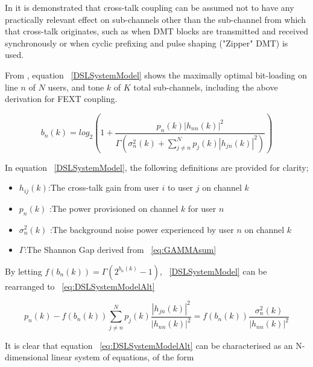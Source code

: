 In \cite{AM09} it is demonstrated that cross-talk coupling can be assumed not to have any practically relevant effect on sub-channels other than the sub-channel from which that cross-talk originates, such as when DMT blocks are transmitted and received synchronously or when cyclic prefixing and pulse shaping ("Zipper" DMT\cite{FSJ99}) is used.

From \cite{CA06}, equation ~\eqref{DSLSystemModel} shows the maximally optimal bit-loading on line \(n\) of \(N\) users, and tone \(k\) of \(K\) total sub-channels, including the above derivation for FEXT coupling.

\begin{equation}\label{DSLSystemModel}
b_n(k)=log_2\left(1+\frac{p_n(k) |h_{nn}(k)|^2}{\Gamma \left( \sigma_n^2(k)+\sum_{j\neq n}^N p_j(k)|h_{jn}(k)|^2 \right)} \right)
\end{equation}

In equation ~\eqref{DSLSystemModel}, the following definitions are provided for clarity;

\begin{itemize}
  \item \(h_{ij}(k)\):The cross-talk gain from user \(i\) to user \(j\) on channel \(k\)
  \item \(p_n(k)\) :The power provisioned on channel \(k\) for user \(n\)
  \item \(\sigma^2_n(k)\) :The background noise power experienced by user \(n\) on channel \(k\)
  \item \(\Gamma\):The Shannon Gap derived from ~\eqref{eq:GAMMAsum}
\end{itemize}

By letting \(f(b_n(k))=\Gamma(2^{b_n(k)}-1)\), ~\eqref{DSLSystemModel} can be rearranged to ~\eqref{eq:DSLSystemModelAlt}

\begin{equation}\label{eq:DSLSystemModelAlt}
p_n(k)-f(b_n(k))\sum_{j\neq n}^N p_j(k) \frac{|h_{jn}(k)|^2}{|h_{nn}(k)|^2}=f(b_n(k))\frac{\sigma_n^2(k)}{|h_{nn}(k)|^2}
\end{equation}

It is clear that equation ~\eqref{eq:DSLSystemModelAlt} can be characterised as an N-dimensional linear system of equations, of the form 

